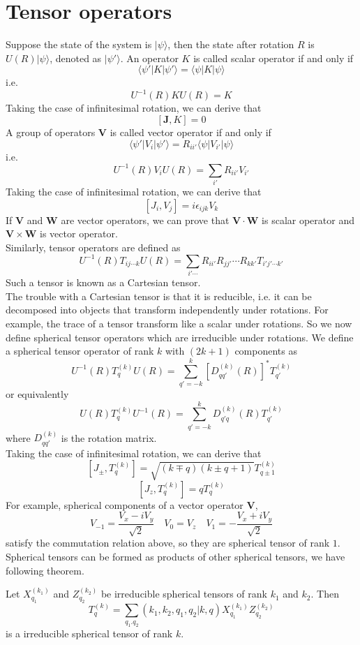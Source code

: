 \section{Tensor operators}
Suppose the state of the system is $|\psi\rangle$, then the state after rotation $R$ is $U(R)|\psi\rangle$, denoted as $|\psi'\rangle$. An operator $K$ is called scalar operator if and only if
\[\langle \psi' | K | \psi' \rangle = \langle \psi | K | \psi\rangle\]
i.e.
\[U^{-1}(R)KU(R) = K\]
Taking the case of infinitesimal rotation, we can derive that
\[[\bm{J},K] = 0\]
A group of operators $\bm{V}$ is called vector operator if and only if
\[\langle \psi' | V_i | \psi' \rangle = R_{ii'} \langle \psi | V_{i'} | \psi\rangle\]
i.e.
\[U^{-1}(R)V_{i}U(R) = \sum_{i'} R_{ii'} V_{i'}\]
Taking the case of infinitesimal rotation, we can derive that
\[[J_i, V_j] = i\epsilon_{ijk}V_k\]
If $\bm{V}$ and $\bm{W}$ are vector operators, we can prove that $\bm{V} \cdot \bm{W}$ is scalar operator and $\bm{V} \times \bm{W}$ is vector operator.\\
Similarly, tensor operators are defined as
\[U^{-1}(R) T_{ij\cdots k} U(R) = \sum_{i'\cdots} R_{ii'} R_{jj'} \cdots R_{kk'} T_{i'j'\cdots k'}\]
Such a tensor is known as a Cartesian tensor.\\
The trouble with a Cartesian tensor is that it is reducible, i.e. it can be decomposed into objects that transform independently under rotations. For example, the trace of a tensor transform like a scalar under rotations. 
So we now define spherical tensor operators which are irreducible under rotations.  We define a spherical tensor operator of rank $k$ with $(2k+1)$ components as
\[U^{-1}(R) T^{(k)}_q U(R) = \sum_{q'=-k}^{k} [D^{(k)}_{qq'}(R)]^* T^{(k)}_{q'}\]
or equivalently
\[U(R) T^{(k)}_q U^{-1}(R) = \sum_{q'=-k}^{k} D^{(k)}_{q'q}(R) T^{(k)}_{q'}\]
where $D^{(k)}_{qq'}$ is the rotation matrix.\\
Taking the case of infinitesimal rotation, we can derive that
\[[J_{\pm},T^{(k)}_{q}] = \sqrt{(k \mp q)(k \pm q +1)} T^{(k)}_{q \pm 1}\]
\[[J_z, T^{(k)}_{q}] = q T^{(k)}_{q}\]
For example, spherical components of a vector operator $\bm{V}$, 
\[V_{-1} = \frac{V_x - i V_y}{\sqrt{2}} \quad V_0 = V_z \quad V_{1} = -\frac{V_x + i V_y}{\sqrt{2}}\]
satisfy the commutation relation above, so they are spherical tensor of rank $1$.
Spherical tensors can be formed as products of other spherical  tensors, we have following theorem.
\newpage
\begin{newthem}
Let $X^{(k_1)}_{q_1}$ and $Z^{(k_2)}_{q_2}$ be irreducible spherical tensors of rank $k_1$ and $k_2$. Then
\[T^{(k)}_{q} = \sum_{q_1.q_2} (k_1,k_2,q_1,q_2|k,q) X^{(k_1)}_{q_1} Z^{(k_2)}_{q_2}\]
is a irreducible spherical tensor of rank $k$. 
\end{newthem}
